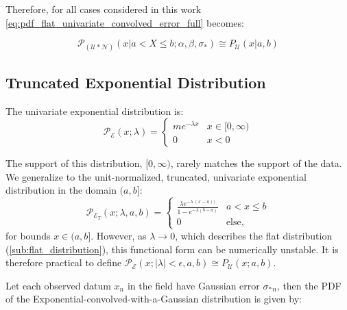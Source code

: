 \documentclass[twocolumn]{aastex631}
\newcommand{\mcal}[1]{\mathcal{#1}}
\newcommand{\Exp}[1]{e^{#1}}
\newcommand{\pdf}{\mcal{P}}
\newcommand{\sigobs}{{\sigma_*}}
\begin{document}
        Therefore, for all cases considered in this work \eqref{eq:pdf_flat_univariate_convolved_error_full} becomes:

        \begin{equation}\label{eq:pdf_flat_univariate_convolved_error}
            \pdf_{(\mcal{U}*\mcal{N})}(x | a < X \leq b; \alpha, \beta, \sigobs) \cong P_{\mcal{U}}(x|a,b)
        \end{equation}
        

    \vspace{10pt}
    \subsection{Truncated Exponential Distribution} \label{sub:exponential_distribution}
    
        The univariate exponential distribution is:
        \begin{equation} \label{eq:pdf_exp_univariate}
            \pdf_{\mcal{E}}(x; \lambda) = \begin{cases}
                m \Exp{-\lambda x} & x \in [0, \infty) \\
                0 & x < 0
            \end{cases}
        \end{equation}
    
        The support of this distribution, $[0, \infty)$, rarely matches the support of the data. We generalize to the unit-normalized, truncated, univariate exponential distribution in the domain $(a, b]$:
        \begin{equation} \label{eq:pdf_truncexp_univariate}
            \pdf_{\mcal{E}_T}(x; \lambda, a, b) = \begin{cases}
                \frac{\lambda \Exp{-\lambda \, (x - a))}}{1 - \Exp{-\lambda(b - a)}} & a < x \leq b \\
                0 & \text{else},
            \end{cases}
        \end{equation}
        for bounds $x \in (a,b]$. However, as $\lambda \rightarrow 0$, which describes the flat distribution (\autoref{sub:flat_distribution}), this functional form can be numerically unstable. It is therefore practical to define $\pdf_{\mcal{E}}(x; |\lambda| < \epsilon, a, b) \cong P_{\mcal{U}}(x; a,b)$.

        Let each observed datum $x_n$ in the field have Gaussian error $\sigobs_n$,
        then the PDF of the Exponential-convolved-with-a-Gaussian distribution is given by:
\end{document}
